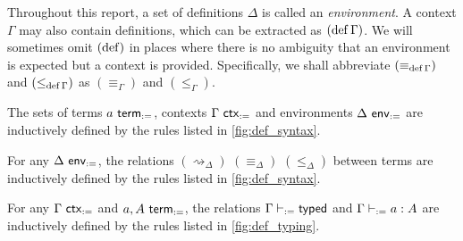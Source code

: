 \documentclass[twoside]{report}
\begin{document}
Throughout this report, a set of definitions $\Delta$ is called an \emph{environment}. A context $\Gamma$ may also contain definitions, which can be extracted as $(\operatorname{def} \Gamma)$. We will sometimes omit $(\operatorname{def})$ in places where there is no ambiguity that an environment is expected but a context is provided. Specifically, we shall abbreviate $(\equiv_{\operatorname{def} \Gamma})$ and $(\leq_{\operatorname{def} \Gamma})$ as $(\equiv_\Gamma)$ and $(\leq_\Gamma)$.

\begin{definition}[Syntax]
    \label{def:def_syntax}
    The sets of terms $a \ \mathsf{term}_{:=}$, contexts $\Gamma \ \mathsf{ctx}_{:=}$ and environments $\Delta \ \mathsf{env}_{:=}$ are inductively defined by the rules listed in \cref{fig:def_syntax}.
\end{definition}

\begin{definition}
    \label{def:def_conversion}
    For any $\Delta \ \mathsf{env}_{:=}$, the relations $(\rightsquigarrow_\Delta)$ $(\equiv_\Delta)$ $(\leq_\Delta)$ between terms are inductively defined by the rules listed in \cref{fig:def_syntax}.
\end{definition}

\begin{definition}
    \label{def:def_typing}
    For any $\Gamma \ \mathsf{ctx}_{:=}$ and $a, A \ \mathsf{term}_{:=}$, the relations $\Gamma \vdash_{:=} \mathsf{typed}$ and $\Gamma \vdash_{:=} a : A$ are inductively defined by the rules listed in \cref{fig:def_typing}.
\end{definition}
\end{document}
